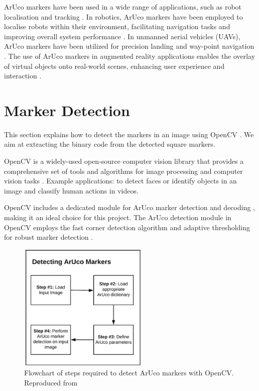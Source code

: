 \documentclass[12pt,a4paper]{report}
\def\aruco{ArUco }
\begin{document}
\aruco markers have been used in a wide range of applications, such as robot localisation and tracking \cite{garrido2014automatic}. In robotics, ArUco markers have been employed to localise robots within their environment, facilitating navigation tasks and improving overall system performance \cite{gil2010}. In unmanned aerial vehicles (UAVs), ArUco markers have been utilized for precision landing and way-point navigation \cite{marut2019}. The use of ArUco markers in augmented reality applications enables the overlay of virtual objects onto real-world scenes, enhancing user experience and interaction \cite{kato1999marker}\cite{wagner2008}.

\newpage
\section{Marker Detection}
\label{2.3 Marker Detection}
This section explains how to detect the markers in an image using OpenCV \cite{bradski2008learning}. We aim at extracting the binary code from the detected square markers.

OpenCV  is a widely-used open-source computer vision library that provides a comprehensive set of tools and algorithms for image processing and computer vision tasks \cite{opencvabout}\cite{bradski2008learning}. Example applications: to detect faces or identify objects in an image and classify human actions in videos.

OpenCV includes a dedicated module for ArUco marker detection \cite{opencvdetectionaruco} and decoding \cite{opencvarucomodule}\cite{opencvaruco}, making it an ideal choice for this project. The ArUco detection module in OpenCV employs the fast corner detection algorithm and adaptive thresholding for robust marker detection \cite{garrido2016generation}.

\begin{figure}
    \includegraphics[width = 0.55\textwidth]{Images/detectaruco.png}
    \caption[Flowchart of steps required to detect \aruco markers]{Flowchart of steps required to detect \aruco markers with OpenCV.\\Reproduced from \cite{pyimagesearch}}
    \label{fig: Figure 2}
\end{figure}
\end{document}
